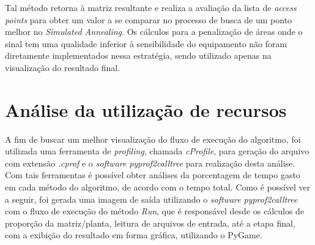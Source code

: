\documentclass[
	12pt,				%
	twoside,			%
	a4paper,			%
	english,			%
	french,				%
	spanish,			%
	brazil				%
	]{abntex2}
\begin{document}
\begin{center}
    \fbox{

        
    }
\end{center}

Tal método retorna à matriz resultante e realiza a avaliação da lista de
\emph{access points} para obter um valor a se comparar no processo de
busca de um ponto melhor no \emph{Simulated Annealing}. Os cálculos para
a penalização de áreas onde o sinal tem uma qualidade inferior à
sensibilidade do equipamento não foram diretamente implementados nessa
estratégia, sendo utilizado apenas na visualização do resultado final.

\section{Análise da utilização de
recursos}\label{anuxe1lise-da-utilizauxe7uxe3o-de-recursos}

A fim de buscar um melhor visualização do fluxo de execução do
algoritmo, foi utilizada uma ferramenta de \emph{profiling}, chamada
\emph{cProfile}, para geração do arquivo com extensão \emph{.cprof} e o
\emph{software} \emph{pyprof2calltree} para realização desta análise.
Com tais ferramentas é possível obter análises da porcentagem de tempo
gasto em cada método do algoritmo, de acordo com o tempo total. Como é
possível ver a seguir, foi gerada uma imagem de saída utilizando o
\emph{software} \emph{pyprof2calltree} com o fluxo de execução do método
\emph{Run}, que é responsável desde os cálculos de proporção da
matriz/planta, leitura de arquivos de entrada, até a etapa final, com a
exibição do resultado em forma gráfica, utilizando o PyGame.
\end{document}
